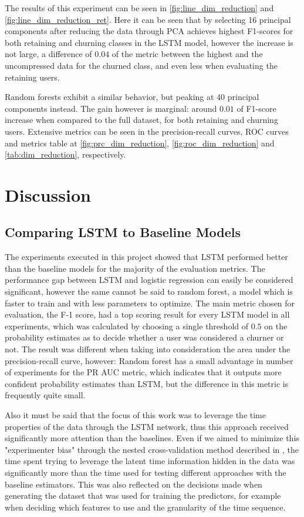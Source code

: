 \documentclass{kththesis}
\begin{document}
The results of this experiment can be seen in \autoref{fig:line_dim_reduction} and \autoref{fig:line_dim_reduction_ret}. Here it can be seen that by selecting 16 principal components after reducing the data through PCA achieves highest F1-scores for both retaining and churning classes in the LSTM model, however the increase is not large, a difference of $0.04$ of the metric between the highest and the uncompressed data for the churned class, and even less when evaluating the retaining users.

Random forests exhibit a similar behavior, but peaking at 40 principal components instead. The gain however is marginal: around $0.01$ of F1-score increase when compared to the full dataset, for both retaining and churning users. Extensive metrics can be seen in the precision-recall curves, ROC curves and metrics table at \autoref{fig:prc_dim_reduction}, \autoref{fig:roc_dim_reduction} and \autoref{tab:dim_reduction}, respectively.

\chapter{Discussion}

\section{Comparing LSTM to Baseline Models}

The experiments executed in this project showed that LSTM  performed better than the baseline models for the majority of the evaluation metrics. The performance gap between LSTM and logistic regression can easily be considered significant, however the same cannot be said to random forest, a model which is faster to train and with less parameters to optimize. The main metric chosen for evaluation, the F-1 score, had a top scoring result for every LSTM model in all experiments, which was calculated by choosing a single threshold of $0.5$ on the probability estimates as to decide whether a user was considered a churner or not. The result was different when taking into consideration the area under the precision-recall curve, however: Random forest has a small advantage in number of experiments for the PR AUC metric, which indicates that it outputs more confident probability estimates than LSTM, but the difference in this metric is frequently quite small. 

Also it must be said that the focus of this work was to leverage the time properties of the data through the LSTM network, thus this approach received significantly more attention than the baselines. Even if we aimed to minimize this "experimenter bias" through the nested cross-validation method described in , the time spent trying to leverage the latent time information hidden in the data was significantly more than the time used for testing different approaches with the baseline estimators. This was also reflected on the decisions made when generating the dataset that was used for training the predictors, for example when deciding which features to use and the granularity of the time sequence. 
\end{document}
